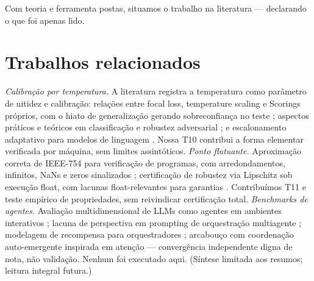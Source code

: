 Com teoria e ferramenta postas, situamos o trabalho na literatura --- declarando o que foi apenas lido.
\section{Trabalhos relacionados}
\textit{Calibração por temperatura.} A literatura registra a temperatura como parâmetro de nitidez e calibração: relações entre focal loss, temperature scaling e Scorings próprios, com o hiato de generalização gerando sobreconfiança no teste \cite{komisarenko2024}; aspectos práticos e teóricos em classificação e robustez adversarial \cite{xuan2025}; e escalonamento adaptativo para modelos de linguagem \cite{xie2024}. Nossa T10 contribui a forma elementar verificada por máquina, sem limites assintóticos. \textit{Ponto flutuante.} Aproximação correta de IEEE-754 para verificação de programas, com arredondamentos, infinitos, NaNs e zeros sinalizados \cite{bagnara2019}; certificação de robustez via Lipschitz sob execução float, com lacunas float-relevantes para garantias \cite{murray2026}. Contribuímos T11 e teste empírico de propriedades, sem reivindicar certificação total. \textit{Benchmarks de agentes.} Avaliação multidimensional de LLMs como agentes em ambientes interativos \cite{agentbench2023}; lacuna de perspectiva em prompting de orquestração multiagente \cite{perspectivegap2026}; modelagem de recompensa para orquestradores \cite{orchrm2026}; arcabouço com coordenação auto-emergente inspirada em atenção \cite{orchestrator2025} --- convergência independente digna de nota, não validação. Nenhum foi executado aqui. (Síntese limitada aos resumos; leitura integral futura.)
